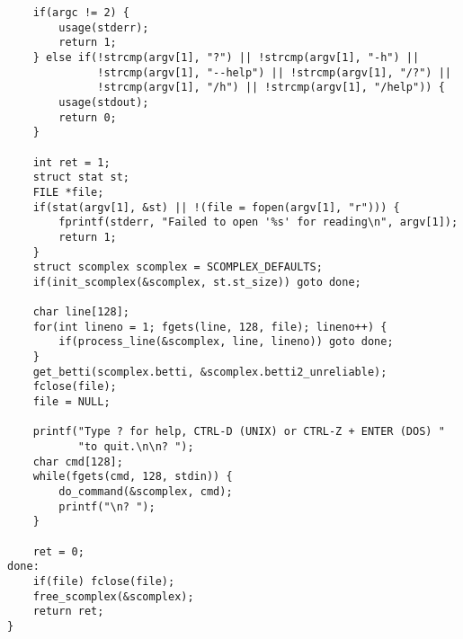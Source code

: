 \documentclass{article}
\begin{document}
\begin{verbatim}
    if(argc != 2) {
        usage(stderr);
        return 1;
    } else if(!strcmp(argv[1], "?") || !strcmp(argv[1], "-h") ||
              !strcmp(argv[1], "--help") || !strcmp(argv[1], "/?") ||
              !strcmp(argv[1], "/h") || !strcmp(argv[1], "/help")) {
        usage(stdout);
        return 0;
    }

    int ret = 1;
    struct stat st;
    FILE *file;
    if(stat(argv[1], &st) || !(file = fopen(argv[1], "r"))) {
        fprintf(stderr, "Failed to open '%s' for reading\n", argv[1]);
        return 1;
    }
    struct scomplex scomplex = SCOMPLEX_DEFAULTS;
    if(init_scomplex(&scomplex, st.st_size)) goto done;

    char line[128];
    for(int lineno = 1; fgets(line, 128, file); lineno++) {
        if(process_line(&scomplex, line, lineno)) goto done;
    }
    get_betti(scomplex.betti, &scomplex.betti2_unreliable);
    fclose(file);
    file = NULL;

    printf("Type ? for help, CTRL-D (UNIX) or CTRL-Z + ENTER (DOS) "
           "to quit.\n\n? ");
    char cmd[128];
    while(fgets(cmd, 128, stdin)) {
        do_command(&scomplex, cmd);
        printf("\n? ");
    }

    ret = 0;
done:
    if(file) fclose(file);
    free_scomplex(&scomplex);
    return ret;
}

\end{verbatim}
\normalsize
\end{document}
